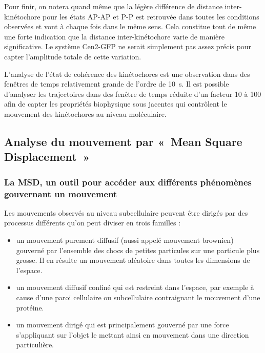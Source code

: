 \documentclass[12pt,a4paper,twoside,openright]{book}
\begin{document}
Pour finir, on notera quand même que la légère différence de distance
inter-kinétochore pour les états AP-AP et P-P est retrouvée dans toutes
les conditions observées et vont à chaque fois dans le même sens. Cela
constitue tout de même une forte indication que la distance
inter-kinétochore varie de manière significative. Le système Cen2-GFP ne
serait simplement pas assez précis pour capter l'amplitude totale de
cette variation.

L'analyse de l'état de cohérence des kinétochores est une observation
dans des fenêtres de temps relativement grande de l'ordre de 10~s. Il
est possible d'analyser les trajectoires dans des fenêtre de temps
réduite d'un facteur 10 à 100 afin de capter les propriétés biophysique
sous jacentes qui contrôlent le mouvement des kinétochores au niveau
moléculaire.

\subsection{Analyse du mouvement par «~Mean Square
Displacement~»}\label{analyse-du-mouvement-par-mean-square-displacement}

\subsubsection{La MSD, un outil pour accéder aux différents phénomènes
gouvernant un
mouvement}\label{la-msd-un-outil-pour-accuxe9der-aux-diffuxe9rents-phuxe9nomuxe8nes-gouvernant-un-mouvement}

\label{sec:msd-tool}

Les mouvements observés au niveau subcellulaire peuvent être dirigés par
des processus différents qu'on peut diviser en trois familles :

\begin{itemize}
\item
  un mouvement purement diffusif (aussi appelé mouvement brownien)
  gouverné par l'ensemble des chocs de petites particules sur une
  particule plus grosse. Il en résulte un mouvement aléatoire dans
  toutes les dimensions de l'espace.
\item
  un mouvement diffusif confiné qui est restreint dans l'espace, par
  exemple à cause d'une paroi cellulaire ou subcellulaire contraignant
  le mouvement d'une protéine.
\item
  un mouvement dirigé qui est principalement gouverné par une force
  s'appliquant sur l'objet le mettant ainsi en mouvement dans une
  direction particulière.
\end{itemize}
\end{document}
